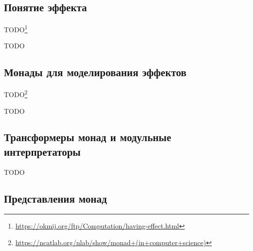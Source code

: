 


\subsection{Понятие эффекта}

TODO\footnote{\url{https://okmij.org/ftp/Computation/having-effect.html}} %

TODO %

\subsection{Монады для моделирования эффектов}



TODO\footnote{\url{https://ncatlab.org/nlab/show/monad+(in+computer+science)}} %


TODO %

\subsection{Трансформеры монад и модульные интерпретаторы}




TODO %

\subsection{Представления монад}







